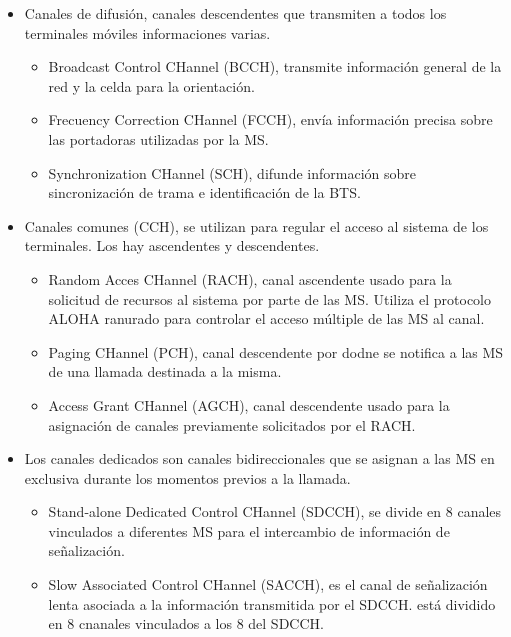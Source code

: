 \begin{itemize}
	\item Canales de difusión, canales descendentes que transmiten a todos los terminales móviles informaciones varias.
	\begin{itemize}
		\item Broadcast Control CHannel (\acrshort{BCCH}), transmite información general de la red y la celda para la orientación.
		\item Frecuency Correction CHannel (\acrshort{FCCH}), envía información precisa sobre las portadoras utilizadas por la \acrshort{MS}.
		\item Synchronization CHannel (\acrshort{SCH}), difunde información sobre sincronización de trama e identificación de la \acrshort{BTS}.
	\end{itemize}
	\item Canales comunes (\acrshort{CCH}), se utilizan para regular el acceso al sistema de los terminales. Los hay ascendentes y descendentes.
	\begin{itemize}
		\item Random Acces CHannel (\acrshort{RACH}), canal ascendente usado para la solicitud de recursos al sistema por parte de las \acrshort{MS}. Utiliza el protocolo ALOHA ranurado para controlar el acceso múltiple de las \acrshort{MS} al canal.
		\item Paging CHannel (\acrshort{PCH}), canal descendente por dodne se notifica a las \acrshort{MS}  de una llamada destinada a la misma.
		\item Access Grant CHannel (\acrshort{AGCH}), canal descendente usado para la asignación de canales previamente solicitados por el \acrshort{RACH}.
	\end{itemize}
	\item Los canales dedicados son canales bidireccionales que se asignan a las \acrshort{MS} en exclusiva durante los momentos previos a la llamada.
	\begin{itemize}
		\item Stand-alone Dedicated Control CHannel (SDCCH), se divide en 8 canales vinculados a diferentes \acrshort{MS} para el intercambio de información de señalización.
		\item Slow Associated Control CHannel (\acrshort{SACCH}), es el canal de señalización lenta asociada a la información transmitida por el SDCCH. está dividido en 8 cnanales vinculados a los 8 del SDCCH.
	\end{itemize}
\end{itemize}
